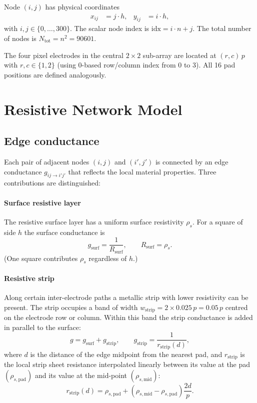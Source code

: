 \documentclass[preprint,numbers,1p]{elsarticle}
\begin{document}
Node $(i,j)$ has physical coordinates
\begin{align}
  x_{ij} &= j \cdot h, & y_{ij} &= i \cdot h,
\end{align}
with $i,j \in \{0,\ldots,300\}$. The scalar node index is $\mathrm{idx} = i \cdot n + j$.
The total number of nodes is $N_\mathrm{tot} = n^2 = 90601$.

The four pixel electrodes in the central $2\times2$ sub-array are located at
$(r,c)\,p$ with $r,c\in\{1,2\}$ (using 0-based row/column index from 0 to 3). All 16 pad
positions are defined analogously.

\section{Resistive Network Model}
\label{sec:network}

\subsection{Edge conductance}
\label{sec:edge}

Each pair of adjacent nodes $(i,j)$ and $(i',j')$ is connected by an edge conductance
$g_{ij\to i'j'}$ that reflects the local material properties. Three contributions are
distinguished:

\paragraph{Surface resistive layer}
The resistive surface layer has a uniform surface resistivity $\rho_s$. For a square of side $h$
the surface conductance is
\begin{equation}
  g_\mathrm{surf} = \frac{1}{R_\mathrm{surf}}, \qquad
  R_\mathrm{surf} = \rho_s.
\end{equation}
(One square contributes $\rho_s$ regardless of $h$.)

\paragraph{Resistive strip}
Along certain inter-electrode paths a metallic strip with lower resistivity can be present.
The strip occupies a band of width $w_\mathrm{strip} = 2\times0.025\,p = 0.05\,p$ centred on
the electrode row or column. Within this band the strip conductance is added in parallel to the
surface:
\begin{equation}
  g = g_\mathrm{surf} + g_\mathrm{strip}, \qquad
  g_\mathrm{strip} = \frac{1}{r_\mathrm{strip}(d)},
\end{equation}
where $d$ is the distance of the edge midpoint from the nearest pad, and $r_\mathrm{strip}$
is the local strip sheet resistance interpolated linearly between its value at the pad
$(\rho_{s,\mathrm{pad}})$ and its value at the mid-point $(\rho_{s,\mathrm{mid}})$:
\begin{equation}
  r_\mathrm{strip}(d) = \rho_{s,\mathrm{pad}} + (\rho_{s,\mathrm{mid}} - \rho_{s,\mathrm{pad}})
  \frac{2d}{p}.
\end{equation}
\end{document}
